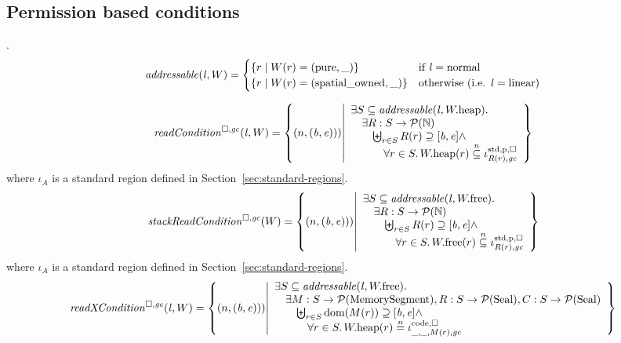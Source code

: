 \documentclass[a4paper]{article}
\begin{document}
\subsection{Permission based conditions}
.
\[
  \addressable{\lin,W} =
  \begin{cases}
    \{ r \mid W(r) = (\pure,\_) \} & \text{if $\lin = \normal$} \\
    \{ r \mid W(r) = (\spatialo,\_) \}  & \text{otherwise (i.e. $\lin = \linear$)} \\
  \end{cases}
\]

\[
  \readCond{\lin,W} = \left\{ \npair{(\baddr,\eaddr})) \middle| 
    \begin{array}{l}
      \exists S \subseteq \addressable{\lin, \pwheap} \ldotp \\
      \quad \exists R : S \fun \powerset{\nats} \\
      \qquad \biguplus_{r\in S} R(r) \supseteq [\baddr,\eaddr] \wedge\\
      \qquad \quad \forall r \in S \ldotp \pwheap(r) \nsubeq \stdreg{R(r),\gc}{\pur}
    \end{array}
  \right\}
\]
where $\iota_A$ is a standard region defined in Section~\ref{sec:standard-regions}.
\[
  \stackReadCond{W} = \left\{ \npair{(\baddr,\eaddr})) \middle| 
    \begin{array}{l}
      \exists S \subseteq \addressable{\lin, \pwfree} \ldotp \\
      \quad \exists R : S \fun \powerset{\nats} \\
      \qquad \biguplus_{r\in S} R(r) \supseteq [\baddr,\eaddr] \wedge \\
      \qquad \quad \forall r \in S \ldotp \pwfree(r) \nsubeq \stdreg{R(r),\gc}{\pur}
    \end{array}
  \right\}
\]
where $\iota_A$ is a standard region defined in Section~\ref{sec:standard-regions}.
\[
  \xReadCond{\lin,W} = \left\{ \npair{(\baddr,\eaddr})) \middle| 
    \begin{array}{l}
      \exists S \subseteq \addressable{\lin, \pwfree} \ldotp \\
      \quad \exists M : S \fun \powerset{\MemSeg}, R : S \fun \powerset{\Seal}, C : S \fun \powerset{\Seal} \\
      \qquad \biguplus_{r\in S} \dom(M(r)) \supseteq [\baddr,\eaddr] \wedge\\
      \qquad \quad \forall r \in S \ldotp  \pwheap(r) \nequal \codereg{\_,\_,M(r),\gc}
    \end{array}
  \right\}
\]
\end{document}
